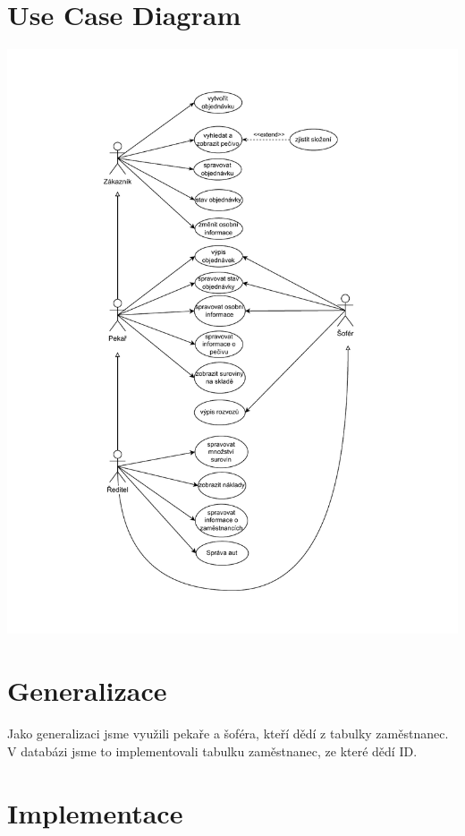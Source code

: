 \documentclass[a4paper, 12pt]{article}
\begin{document}
\section{Use Case Diagram}
\begin{center}
    \includegraphics[scale=0.75]{img/uml.pdf}
\end{center}

\section{Generalizace}
Jako generalizaci jsme využili pekaře a šoféra, kteří dědí z tabulky zaměstnanec. V databázi jsme to implementovali tabulku zaměstnanec, ze které dědí ID.

\section{Implementace}
\end{document}
